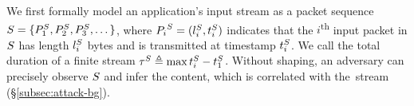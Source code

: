 %
We first formally model an application's input stream as a packet sequence
$S = \{{P^{S}_1}, {P^{S}_2}, {P^{S}_3}, \dots \}$,
where ${P_i}^S = (l^{S}_i, t^{S}_i)$ indicates that the
$i$\textsuperscript{th} input packet in $S$ has length $l^{S}_i$
bytes and is transmitted at timestamp $t^{S}_i$.
We call the total duration of a finite stream $\tau^S
\triangleq \max t^{S}_i - t^{S}_1$.
Without shaping, an adversary can precisely observe $S$ and infer
the content, which is correlated with the~stream (\S\ref{subsec:attack-bg}).

